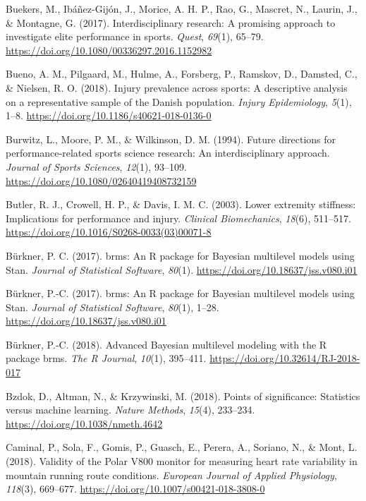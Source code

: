 \documentclass[man,floatsintext]{apa6}
\begin{document}
\leavevmode\hypertarget{ref-Buekers2017}{}%
Buekers, M., Ibáñez-Gijón, J., Morice, A. H. P., Rao, G., Mascret, N., Laurin, J., \& Montagne, G. (2017). Interdisciplinary research: A promising approach to investigate elite performance in sports. \emph{Quest}, \emph{69}(1), 65--79. \url{https://doi.org/10.1080/00336297.2016.1152982}

\leavevmode\hypertarget{ref-Bueno2018}{}%
Bueno, A. M., Pilgaard, M., Hulme, A., Forsberg, P., Ramskov, D., Damsted, C., \& Nielsen, R. O. (2018). Injury prevalence across sports: A descriptive analysis on a representative sample of the Danish population. \emph{Injury Epidemiology}, \emph{5}(1), 1--8. \url{https://doi.org/10.1186/s40621-018-0136-0}

\leavevmode\hypertarget{ref-Burwitz1994}{}%
Burwitz, L., Moore, P. M., \& Wilkinson, D. M. (1994). Future directions for performance‐related sports science research: An interdisciplinary approach. \emph{Journal of Sports Sciences}, \emph{12}(1), 93--109. \url{https://doi.org/10.1080/02640419408732159}

\leavevmode\hypertarget{ref-Butler2003}{}%
Butler, R. J., Crowell, H. P., \& Davis, I. M. C. (2003). Lower extremity stiffness: Implications for performance and injury. \emph{Clinical Biomechanics}, \emph{18}(6), 511--517. \url{https://doi.org/10.1016/S0268-0033(03)00071-8}

\leavevmode\hypertarget{ref-Burkner2017a}{}%
Bürkner, P. C. (2017). brms: An R package for Bayesian multilevel models using Stan. \emph{Journal of Statistical Software}, \emph{80}(1). \url{https://doi.org/10.18637/jss.v080.i01}

\leavevmode\hypertarget{ref-R-brms_a}{}%
Bürkner, P.-C. (2017). brms: An R package for Bayesian multilevel models using Stan. \emph{Journal of Statistical Software}, \emph{80}(1), 1--28. \url{https://doi.org/10.18637/jss.v080.i01}

\leavevmode\hypertarget{ref-R-brms_b}{}%
Bürkner, P.-C. (2018). Advanced Bayesian multilevel modeling with the R package brms. \emph{The R Journal}, \emph{10}(1), 395--411. \url{https://doi.org/10.32614/RJ-2018-017}

\leavevmode\hypertarget{ref-Bzdok2018}{}%
Bzdok, D., Altman, N., \& Krzywinski, M. (2018). Points of significance: Statistics versus machine learning. \emph{Nature Methods}, \emph{15}(4), 233--234. \url{https://doi.org/10.1038/nmeth.4642}

\leavevmode\hypertarget{ref-Caminal2018}{}%
Caminal, P., Sola, F., Gomis, P., Guasch, E., Perera, A., Soriano, N., \& Mont, L. (2018). Validity of the Polar V800 monitor for measuring heart rate variability in mountain running route conditions. \emph{European Journal of Applied Physiology}, \emph{118}(3), 669--677. \url{https://doi.org/10.1007/s00421-018-3808-0}
\end{document}
